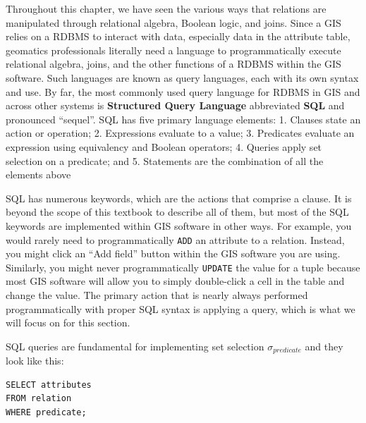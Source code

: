\documentclass[
]{book}
\begin{document}
Throughout this chapter, we have seen the various ways that relations are manipulated through relational algebra, Boolean logic, and joins. Since a GIS relies on a RDBMS to interact with data, especially data in the attribute table, geomatics professionals literally need a language to programmatically execute relational algebra, joins, and the other functions of a RDBMS within the GIS software. Such languages are known as query languages, each with its own syntax and use. By far, the most commonly used query language for RDBMS in GIS and across other systems is \textbf{Structured Query Language} abbreviated \textbf{SQL} and pronounced ``sequel''. SQL has five primary language elements:
1. Clauses state an action or operation;
2. Expressions evaluate to a value;
3. Predicates evaluate an expression using equivalency and Boolean operators;
4. Queries apply set selection on a predicate; and
5. Statements are the combination of all the elements above

SQL has numerous keywords, which are the actions that comprise a clause. It is beyond the scope of this textbook to describe all of them, but most of the SQL keywords are implemented within GIS software in other ways. For example, you would rarely need to programmatically \texttt{ADD} an attribute to a relation. Instead, you might click an ``Add field'' button within the GIS software you are using. Similarly, you might never programmatically \texttt{UPDATE} the value for a tuple because most GIS software will allow you to simply double-click a cell in the table and change the value. The primary action that is nearly always performed programmatically with proper SQL syntax is applying a query, which is what we will focus on for this section.

SQL queries are fundamental for implementing set selection \(σ_{predicate}\) and they look like this:

\begin{verbatim}
SELECT attributes
FROM relation
WHERE predicate;
\end{verbatim}
\end{document}
